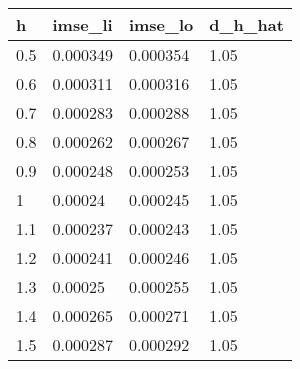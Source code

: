 \begin{tabular}{llll}
  \hline
h & imse\_li & imse\_lo & d\_h\_hat \\ 
  \hline
0.5 & 0.000349 & 0.000354 & 1.05 \\ 
  0.6 & 0.000311 & 0.000316 & 1.05 \\ 
  0.7 & 0.000283 & 0.000288 & 1.05 \\ 
  0.8 & 0.000262 & 0.000267 & 1.05 \\ 
  0.9 & 0.000248 & 0.000253 & 1.05 \\ 
  1 & 0.00024 & 0.000245 & 1.05 \\ 
  1.1 & 0.000237 & 0.000243 & 1.05 \\ 
  1.2 & 0.000241 & 0.000246 & 1.05 \\ 
  1.3 & 0.00025 & 0.000255 & 1.05 \\ 
  1.4 & 0.000265 & 0.000271 & 1.05 \\ 
  1.5 & 0.000287 & 0.000292 & 1.05 \\ 
   \hline
\end{tabular}
